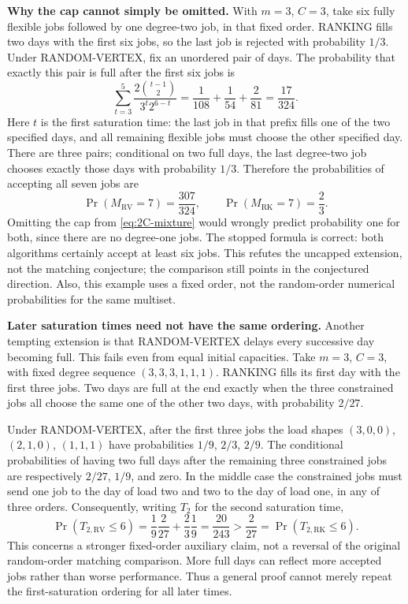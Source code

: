 \documentclass[11pt]{article}
\newcommand{\RV}{\mathrm{RV}}
\newcommand{\RK}{\mathrm{RK}}
\begin{document}
\noindent\textbf{Why the cap cannot simply be omitted.}
With $m=3$, $C=3$, take six fully flexible jobs followed by one degree-two
job, in that fixed order. RANKING fills two days with the first six jobs,
so the last job is rejected with probability $1/3$.
Under RANDOM-VERTEX, fix an unordered pair of days. The probability that
exactly this pair is full after the first six jobs is
\[
 \sum_{t=3}^{5}
 \frac{2\binom{t-1}{2}}{3^t2^{6-t}}
 =\frac1{108}+\frac1{54}+\frac2{81}=\frac{17}{324}.
\]
Here $t$ is the first saturation time: the last job in that prefix fills
one of the two specified days, and all remaining flexible jobs must choose
the other specified day. There are three pairs; conditional on two full
days, the last degree-two job chooses exactly those days with probability
$1/3$. Therefore the probabilities of accepting all seven jobs are
\[
 \Pr(M_\RV=7)=\frac{307}{324},\qquad
 \Pr(M_\RK=7)=\frac23.
\]
Omitting the cap from \eqref{eq:2C-mixture} would wrongly predict
probability one for both, since there are no degree-one jobs. The stopped
formula is correct: both algorithms certainly accept at least six jobs.
This refutes the uncapped extension, not the matching conjecture;
the comparison still points in the conjectured direction. Also, this
example uses a fixed order, not the random-order numerical probabilities
for the same multiset.

\noindent\textbf{Later saturation times need not have the same ordering.}
Another tempting extension is that RANDOM-VERTEX delays every successive
day becoming full. This fails even from equal initial capacities.
Take $m=3$, $C=3$, with fixed degree sequence $(3,3,3,1,1,1)$.
RANKING fills its first day with the first three jobs. Two days are full
at the end exactly when the three constrained jobs all choose the same
one of the other two days, with probability $2/27$.

Under RANDOM-VERTEX, after the first three jobs the load shapes
$(3,0,0)$, $(2,1,0)$, $(1,1,1)$ have probabilities $1/9$, $2/3$, $2/9$.
The conditional probabilities of having two full days after the remaining
three constrained jobs are respectively $2/27$, $1/9$, and zero.
In the middle case the constrained jobs must send one job to the day
of load two and two to the day of load one, in any of three orders.
Consequently, writing $T_2$ for the second saturation time,
\[
 \Pr(T_{2,\RV}\leq6)=\frac19\frac2{27}+\frac23\frac19
 =\frac{20}{243}>\frac2{27}=\Pr(T_{2,\RK}\leq6).
\]
This concerns a stronger fixed-order auxiliary claim, not a reversal of
the original random-order matching comparison. More full days can reflect
more accepted jobs rather than worse performance. Thus a general proof
cannot merely repeat the first-saturation ordering for all later times.
\end{document}
